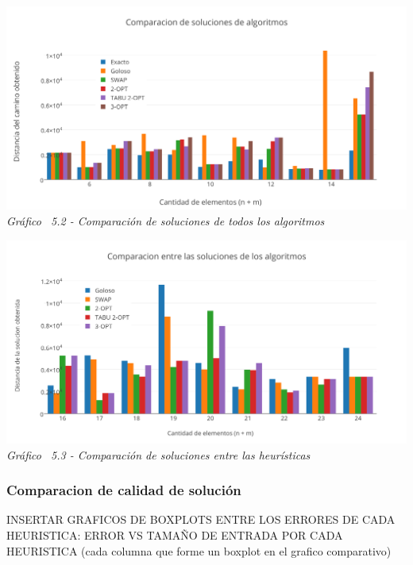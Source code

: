 \vspace*{0.3cm} \vspace*{0.3cm}
  \begin{center}
 \includegraphics[scale=0.5]{./EJ5/comparativo2.png}\\
 {\textit{Gráfico \ 5.2 - Comparaci\'on de soluciones de todos los algoritmos}}
  \end{center}
  \vspace*{0.3cm}

\vspace*{0.3cm} \vspace*{0.3cm}
  \begin{center}
 \includegraphics[scale=0.5]{./EJ5/comparativo1.png}\\
 {\textit{Gráfico \ 5.3 - Comparaci\'on de soluciones entre las heur\'isticas}}
  \end{center}
  \vspace*{0.3cm}


\subsubsection{Comparacion de calidad de solución}
INSERTAR GRAFICOS DE BOXPLOTS ENTRE LOS ERRORES DE CADA HEURISTICA:
	ERROR VS TAMAÑO DE ENTRADA POR CADA HEURISTICA (cada columna que forme un boxplot en el grafico comparativo)
	

